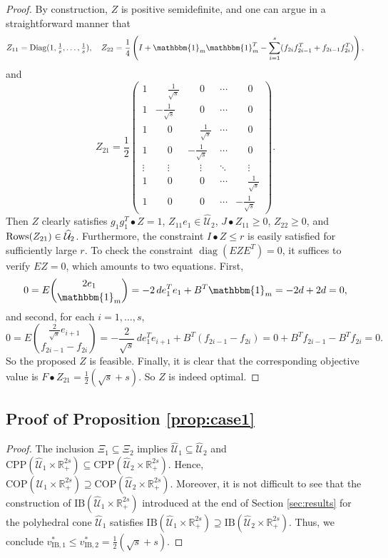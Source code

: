 \documentclass[12pt]{article}
\DeclareMathOperator{\diag}{diag}
\DeclareMathOperator{\Diag}{Diag}
\newcommand{\K}{\widehat{\mathcal{U}}}
\newcommand{\CP}{{\mathrm{CPP}}}
\newcommand{\COP}{{\mathrm{COP}}}
\newcommand{\IB}{\mathrm{IB}}
\def\RR{{\mathbb{R}}}
\begin{document}
\begin{onehalfspace}
\begin{proof}
By construction, $Z$
is positive semidefinite, and one can argue in a straightforward manner
that
\[
Z_{11} = \Diag(1, \tfrac1s, \ldots, \tfrac1s), \quad
Z_{22} = \frac14 \left( I + \mathbbm{1}_m\mathbbm{1}_m^T - \sum_{i=1}^{s}(f_{2i}f_{2i-1}^T + f_{2i-1}f_{2i}^T) \right),
\]
and
\[
Z_{21} = \frac12 \begin{pmatrix}
1 &  \phantom{-}\tfrac{1}{\sqrt{s}} &  \phantom{-}0 & \cdots &  \phantom{-}0 \\
1 & -\tfrac{1}{\sqrt{s}}  &  \phantom{-}0 & \cdots &  \phantom{-}0 \\
1 &  \phantom{-}0 &  \phantom{-}\tfrac{1}{\sqrt{s}} & \cdots &  \phantom{-}0 \\
1 &  \phantom{-}0 & -\tfrac{1}{\sqrt{s}}  & \cdots &  \phantom{-}0 \\
\vdots &  \phantom{-}\vdots &  \phantom{-}\vdots & \ddots &  \phantom{-}\vdots \\
1 &  \phantom{-}0 &  \phantom{-}0 & \cdots &  \phantom{-}\tfrac{1}{\sqrt{s}}  \\
1 &  \phantom{-}0 &  \phantom{-}0 & \cdots & -\tfrac{1}{\sqrt{s}} 
\end{pmatrix}.
\]
Then $Z$ clearly satisfies $g_1g_1^T \bullet Z = 1$, $Z_{11}e_1 \in \K_2$,
$J \bullet Z_{11} \ge 0$, $Z_{22} \ge 0$, and $\text{\rm Rows}(Z_{21}) \in \K_2$.
Furthermore, the constraint $I \bullet Z \le r$ is easily satisfied for
sufficiently large $r$. To check the constraint $\diag(E Z E^T) = 0$, it
suffices to verify $EZ = 0$, which amounts to two equations. First,
\[
0 = E { 2e_1 \choose \mathbbm{1}_m } =  -2 \, d e_1^Te_1 + B^T \mathbbm{1}_m = -2d + 2d = 0,
\]
and second, for each $i=1, \ldots, s$,
\[
0 = E  { \tfrac{2}{\sqrt{s}}e_{i+1} \choose f_{2i-1} - f_{2i} } 
= - \frac{2}{\sqrt{s}} \, de_1^Te_{i+1} + B^T(f_{2i-1} - f_{2i}) 
= 0 + B^Tf_{2i-1} - B^Tf_{2i}
= 0. 
\]
So the proposed $Z$ is feasible. Finally, it is clear that the
corresponding objective value is $F \bullet Z_{21} = \tfrac12 (\sqrt{s}
+ s)$. So $Z$ is indeed optimal.
\end{proof}

\subsection{Proof of Proposition \ref{prop:case1}}

\begin{proof}
The inclusion $\Xi_1 \subseteq \Xi_2$ implies $\K_1 \subseteq \K_2$
and $\CP(\K_1 \times \RR_+^{2s}) \subseteq \CP(\K_2 \times \RR_+^{2s})$.
Hence, $\COP(\K_1 \times \RR_+^{2s}) \supseteq \COP(\K_2 \times \RR_+^{2s})$.
Moreover, it is not difficult to see that the construction of $\IB(\K_1 \times \RR_+^{2s})$
introduced at the end of Section \ref{sec:results} for
the polyhedral cone $\K_1$ satisfies $\IB(\K_1 \times \RR_+^{2s}) \supseteq
\IB(\K_2 \times \RR_+^{2s})$. Thus, we
conclude $v_{\IB,1}^* \le v_{\IB,2}^* = \tfrac12(\sqrt{s} + s)$.


\end{proof}
\end{onehalfspace}
\end{document}

